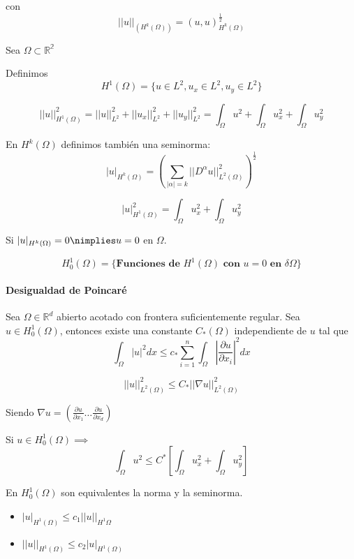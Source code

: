 	con 
	$$||u||_(H^k(\Omega)) = (u,u)^\frac{1}{2}_{H^k(\Omega)}$$
	
	\begin{example}
		Sea $\Omega\subset\mathbb{R^2}$
		
		Definimos
		$$H^1(\Omega) = \{u\in L^2, u_x\in L^2, u_y\in L^2\}$$
		
		$$||u||^2_{H^1(\Omega)} = ||u||^2_{L^2} + ||u_x||^2_{L^2} + ||u_y||^2_{L^2} = 
		\int_\Omega u^2 + \int_\Omega u_x^2 + \int_\Omega u_y^2$$
	\end{example}
	
	En $H^k(\Omega)$ definimos también una seminorma:
	$$|u|_{H^k(\Omega)}  = (\sum_{|\alpha|=k}||D^\alpha u||^2_{L^2(\Omega)})^\frac{1}{2}$$
	
	\begin{example}
		$$|u|^2_{H^1(\Omega)} = \int_{\Omega}u_x^2+\int_{\Omega}u_y^2$$
		
		Si $|u|_{H^k(\Omega)} = 0 \nimplies u = 0$ en $\Omega$.
	\end{example}
	
	$$H_0^1(\Omega) = \{\textbf{Funciones de } H^1(\Omega)\textbf{ con } u = 0 \textbf{ en } \delta \Omega \}$$
	
	\paragraph{Desigualdad de Poincaré}
	Sea $\Omega\in\mathbb{R}^d$ abierto acotado con frontera suficientemente regular. Sea $u\in H_0^1(\Omega)$, entonces existe una constante $C_*(\Omega)$ independiente de $u$ tal que
	$$\int_{\Omega}|u|^2 dx \le c_* \sum_{i=1}^n\int_{\Omega}|\frac{\partial u}{\partial x_i}|^2dx$$
	
	$$||u||^2_{L^2(\Omega)}\le C_*||\nabla u||^2_{L^2(\Omega)}$$
	
	Siendo $\nabla u = (\frac{\partial u}{\partial x_1}\hdots\frac{\partial u}{\partial x_d})$
	
	\begin{example}
		Si $u\in H_0^1(\Omega)\implies$
		$$\int_{\Omega}u^2 \le C^*\left[\int_{\Omega}u_x^2+\int_{\Omega}u_y^2\right]$$
	\end{example}
	
	En $H_0^1(\Omega)$ son equivalentes la norma y la seminorma.
	
	\begin{itemize}
		\item $|u|_{H^1(\Omega)}\le c_1 ||u||_{H^1{\Omega}}$
		\item $||u||_{H^1(\Omega)}\le c_2 |u|_{H^1(\Omega)}$
	\end{itemize}
	

